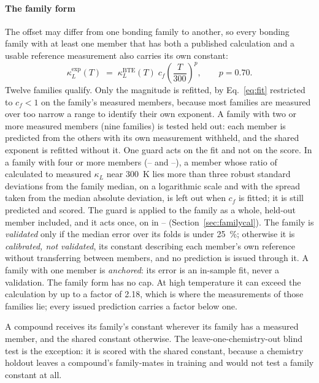 \paragraph{The family form} The offset may differ from one bonding family to another, so every bonding family with at least one
member that has both a published calculation and a usable reference measurement also carries its
own constant:
%
\begin{equation}
  \kappa_L^{\mathrm{exp}}(T) \;=\; \kappa_L^{\mathrm{BTE}}(T)\;
    c_f\left(\frac{T}{300}\right)^{p}, \qquad p = \num{0.70}.
  \label{eq:family}
\end{equation}
%
Twelve families qualify. Only the magnitude is refitted, by Eq.~\eqref{eq:fit} restricted to
$c_f<1$ on the family's measured members, because most families are measured over too narrow a
range to identify their own exponent. A family with two or more measured members (nine families) is
tested held out: each member is predicted from the others with its own measurement withheld, and the
shared exponent is refitted without it. One guard acts on the fit and not on the score. In a family
with four or more members (-- and --), a member whose ratio of calculated
to measured $\kappa_L$ near \SI{300}{\kelvin} lies more than three robust standard deviations from the
family median, on a logarithmic scale and with the spread taken from the median absolute deviation, is
left out when $c_f$ is fitted; it is still predicted and scored. The guard is applied to the family as
a whole, held-out member included, and it acts once, on  in --
(Section~\ref{sec:familycal}). The family is \emph{validated} only if the median error over
its folds is under \SI{25}{\percent}; otherwise it is \emph{calibrated, not validated}, its constant
describing each member's own reference without transferring between members, and no prediction is
issued through it. A family with one member is \emph{anchored}: its error is an in-sample fit, never
a validation. The family form has no cap. At high temperature it can exceed the calculation by up to
a factor of \num{2.18}, which is where the measurements of those families lie; every issued
prediction carries a factor below one.

A compound receives its family's constant wherever its family has a measured member, and the shared
constant otherwise. The leave-one-chemistry-out blind test is the exception: it is scored with the
shared constant, because a chemistry holdout leaves a compound's family-mates in training and would
not test a family constant at all.

